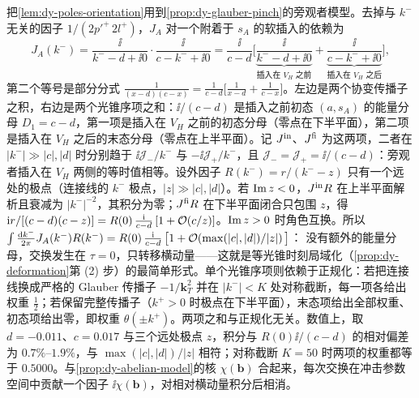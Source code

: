 \begin{example}[旁观者模型的光锥序表示]\label{ex:dy-spectator-lcopt}
把\cref{lem:dy-poles-orientation}用到\cref{prop:dy-glauber-pinch}的旁观者模型。去掉与 $k^-$ 无关的因子 $1/(2p'^+\,2l^+)$，$J_A$ 对一个附着于 $s_A$ 的软插入的依赖为
\begin{equation}\label{eq:dy-JA-two-orderings}
J_A(k^-)=\frac{\ii}{k^--d+\ii0}\cdot\frac{\ii}{c-k^-+\ii0}
=\frac{\ii}{c-d}\Big[\underbrace{\frac{\ii}{k^--d+\ii0}}_{\text{插入在 }V_H\text{ 之前}}+\underbrace{\frac{\ii}{c-k^-+\ii0}}_{\text{插入在 }V_H\text{ 之后}}\Big],
\end{equation}
第二个等号是部分分式 $\frac{1}{(x-d)(c-x)}=\frac{1}{c-d}\big[\frac{1}{x-d}+\frac{1}{c-x}\big]$。左边是两个协变传播子之积，右边是两个光锥序项之和：$\ii/(c-d)$ 是插入之前初态 $(a,s_A)$ 的能量分母 $D_1=c-d$，第一项是插入在 $V_H$ 之前的初态分母（零点在下半平面），第二项是插入在 $V_H$ 之后的末态分母（零点在上半平面）。记 $J^{\rm in}$、$J^{\rm fi}$ 为这两项，二者在 $|k^-|\gg|c|,|d|$ 时分别趋于 $\ii\mathcal J_-/k^-$ 与 $-\ii\mathcal J_+/k^-$，且 $\mathcal J_-=\mathcal J_+=\ii/(c-d)$：旁观者插入在 $V_H$ 两侧的等时值相等。设外因子 $R(k^-)=r/(k^--z)$ 只有一个远处的极点（连接线的 $k^-$ 极点，$|z|\gg|c|,|d|$）。若 $\operatorname{Im} z<0$，$J^{\rm in}R$ 在上半平面解析且衰减为 $|k^-|^{-2}$，其积分为零；$J^{\rm fi}R$ 在下半平面闭合只包围 $z$，得 $\mathrm{i} r/[(c-d)(c-z)]=R(0)\,\frac{\mathrm{i}}{c-d}\,[1+\mathcal{O}\!\left(c/z\right)]$。$\operatorname{Im} z>0$ 时角色互换。所以
$\int\frac{\mathrm{d} k^-}{2\pi}J_A(k^-)R(k^-)=R(0)\,\frac{\mathrm{i}}{c-d}\,\big[1+\mathcal{O}\!\left(\max(|c|,|d|)/|z|\right)\big]$：
没有额外的能量分母，交换发生在 $\tau=0$，只转移横动量——这就是等光锥时刻局域化（\cref{prop:dy-deformation}第 (2) 步）的最简单形式。单个光锥序项则依赖于正规化：若把连接线换成严格的 Glauber 传播子 $-1/\mathbf k_T^2$ 并在 $|k^-|<K$ 处对称截断，每一项各给出权重 $\frac12$；若保留完整传播子（$k^+>0$ 时极点在下半平面），末态项给出全部权重、初态项给出零，即权重 $\theta(\pm k^+)$。两项之和与正规化无关。数值上，取 $d=-0.011$、$c=0.017$ 与三个远处极点 $z$，积分与 $R(0)\ii/(c-d)$ 的相对偏差为 $0.7\%$--$1.9\%$，与 $\max(|c|,|d|)/|z|$ 相符；对称截断 $K=50$ 时两项的权重都等于 $0.5000$。与\cref{prop:dy-abelian-model}的核 $\chi(\boldsymbol b)$ 合起来，每次交换在冲击参数空间中贡献一个因子 $\ii\chi(\boldsymbol b)$，对相对横动量积分后相消。
\end{example}

